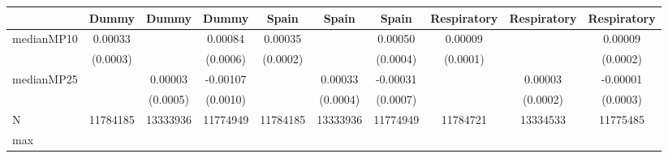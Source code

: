 {
\def\sym#1{\ifmmode^{#1}\else\(^{#1}\)\fi}
\begin{tabular}{l*{9}{c}}
\toprule
            &\multicolumn{1}{c}{Dummy}&\multicolumn{1}{c}{Dummy}&\multicolumn{1}{c}{Dummy}&\multicolumn{1}{c}{Spain}&\multicolumn{1}{c}{Spain}&\multicolumn{1}{c}{Spain}&\multicolumn{1}{c}{Respiratory}&\multicolumn{1}{c}{Respiratory}&\multicolumn{1}{c}{Respiratory}\\
\midrule
medianMP10  &     0.00033         &                     &     0.00084         &     0.00035         &                     &     0.00050         &     0.00009         &                     &     0.00009         \\
            &    (0.0003)         &                     &    (0.0006)         &    (0.0002)         &                     &    (0.0004)         &    (0.0001)         &                     &    (0.0002)         \\
medianMP25  &                     &     0.00003         &    -0.00107         &                     &     0.00033         &    -0.00031         &                     &     0.00003         &    -0.00001         \\
            &                     &    (0.0005)         &    (0.0010)         &                     &    (0.0004)         &    (0.0007)         &                     &    (0.0002)         &    (0.0003)         \\
\midrule
N           &    11784185         &    13333936         &    11774949         &    11784185         &    13333936         &    11774949         &    11784721         &    13334533         &    11775485         \\
max         &                     &                     &                     &                     &                     &                     &                     &                     &                     \\
\bottomrule
\end{tabular}
}

